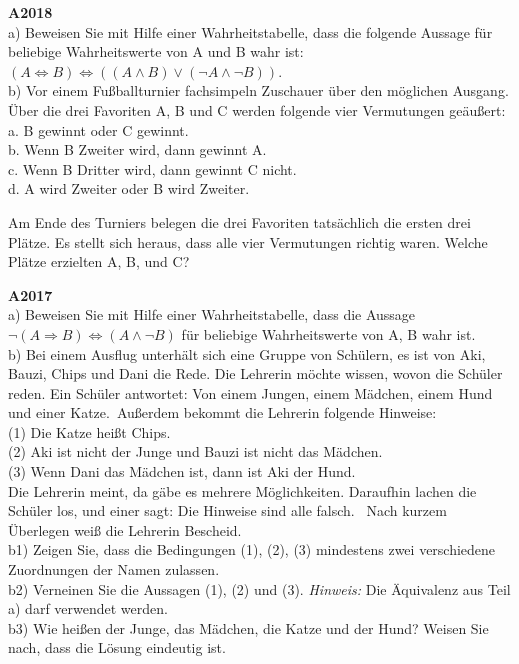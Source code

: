 \documentclass[landscape,twocolumn,a4paper]{article}
\begin{document}
\textbf{A2018} \\

a) Beweisen Sie mit Hilfe einer Wahrheitstabelle, dass die folgende Aussage für beliebige Wahrheitswerte
von A und B wahr ist:  $(A \Leftrightarrow B) \Leftrightarrow ((A \land B) \lor (\lnot A \land \lnot B))$. \\

b) Vor einem Fußballturnier fachsimpeln Zuschauer über den möglichen Ausgang. Über die drei Favoriten A, B und C 
werden folgende vier Vermutungen geäußert: \\

a. B gewinnt oder C gewinnt. \\
b. Wenn B Zweiter wird, dann gewinnt A. \\
c. Wenn B Dritter wird, dann gewinnt C  nicht. \\
d. A wird Zweiter oder B wird Zweiter.

Am Ende des Turniers belegen die drei Favoriten tatsächlich die ersten drei Plätze. Es stellt sich heraus, dass 
alle vier Vermutungen richtig waren. Welche Plätze erzielten A, B, und C?
\bigskip 

\textbf{A2017} \\

a) Beweisen Sie mit Hilfe einer Wahrheitstabelle, dass die Aussage
$\lnot (A \Rightarrow B) \Leftrightarrow (A \land \lnot B)$ 
für beliebige Wahrheitswerte von A, B wahr ist. \\

b) Bei einem Ausflug unterhält sich eine Gruppe von Schülern, es ist von Aki, Bauzi, Chips und
Dani die Rede. Die Lehrerin möchte wissen, wovon die Schüler reden. Ein Schüler antwortet:
\glqq Von einem Jungen, einem Mädchen, einem Hund und einer Katze.\grqq\, Außerdem bekommt die
Lehrerin folgende Hinweise: \\
(1) Die Katze heißt Chips. \\
(2) Aki ist nicht der Junge und Bauzi ist nicht das Mädchen. \\
(3) Wenn Dani das Mädchen ist, dann ist Aki der Hund. \\
Die Lehrerin meint, da gäbe es mehrere Möglichkeiten. Daraufhin lachen die Schüler los, und
einer sagt: \glqq Die Hinweise sind alle falsch. \grqq\, Nach kurzem Überlegen weiß die Lehrerin Bescheid. \\

b1) Zeigen Sie, dass die Bedingungen (1), (2), (3) mindestens zwei verschiedene Zuordnungen
der Namen zulassen. \\
b2) Verneinen Sie die Aussagen (1), (2) und (3). 
\textit{Hinweis:} Die Äquivalenz aus Teil a) darf verwendet werden. \\
b3) Wie heißen der Junge, das Mädchen, die Katze und der Hund? Weisen Sie nach, dass
die Lösung eindeutig ist.
\bigskip 
\end{document}
